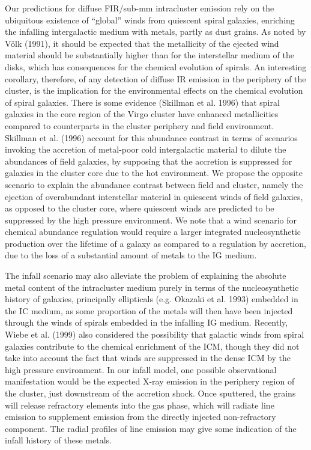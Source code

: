 \documentclass[]{aa}
\begin{document}
Our predictions for diffuse FIR/sub-mm intracluster emission rely on 
the ubiquitous existence of ``global'' winds from quiescent spiral
galaxies, enriching the infalling intergalactic medium with metals,
partly as dust grains.
As noted by V\"olk (1991), it should be expected that the metallicity
of the ejected wind material should be substantially higher than for
the interstellar medium of the disks, which has consequences for the
chemical evolution of spirals. An interesting corollary, therefore, of
any detection of diffuse IR emission in the periphery of the cluster,
is the implication for the environmental effects on the chemical 
evolution of spiral galaxies. 
There is some evidence (Skillman et al. 1996) that spiral galaxies in the
core region of the Virgo cluster have enhanced metallicities compared to
counterparts in the cluster periphery and field environment. 
Skillman et al. (1996) account for this abundance contrast 
in terms of scenarios invoking the accretion of
metal-poor cold intergalactic material to dilute the abundances of field
galaxies, by supposing that the accretion is suppressed for galaxies in the 
cluster core due to the hot environment.
We propose the opposite scenario to explain the abundance contrast between
field and cluster, namely the ejection of overabundant interstellar
material in quiescent winds of field galaxies, as opposed to the
cluster core, where quiescent winds are predicted
to be suppressed by the high pressure environment.
We note that a wind scenario for chemical abundance regulation would
require a larger integrated nucleosynthetic production over the
lifetime of a galaxy as compared to a regulation by accretion, due to the 
loss of a substantial amount of metals to the IG medium.

The infall scenario may also alleviate the problem of explaining the 
absolute metal content of
the intracluster medium purely in terms of the nucleosynthetic 
history of galaxies, principally ellipticals (e.g. Okazaki et al. 1993) 
embedded in the IC medium, as some proportion of the metals
will then have been injected through the winds of spirals
embedded in the infalling IG medium. Recently, Wiebe et al. (1999) also 
considered the possibility that galactic winds from spiral 
galaxies contribute to the chemical enrichment of the ICM, though they did 
not take into account the fact that winds are suppressed in the dense ICM by 
the high pressure environment. In our infall model, one possible observational
manifestation would be the expected X-ray emission
in the periphery region of the cluster, just downstream of the accretion 
shock. Once sputtered, the grains will release refractory elements into the
gas phase, which will radiate line emission to supplement emission
from the directly injected non-refractory component.
The radial profiles of line emission may give some indication of the infall 
history of these metals. 
\end{document}
